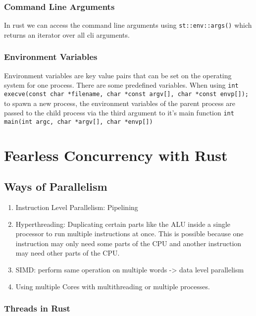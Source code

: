     \subsubsection*{Command Line Arguments}

    In rust we can access the command line arguments using \lstinline{st::env::args()} which returns an iterator over all cli arguments.

    \subsubsection*{Environment Variables}

    Environment variables are key value pairs that can be set on the operating system for one process. There are some predefined variables. When using \lstinline{int execve(const char *filename, char *const argv[], char *const envp[]);} to spawn a new process, the environment variables of the parent process are passed to the child process via the third argument to it's main function \lstinline{int main(int argc, char *argv[], char *envp[])}

    \section{Fearless Concurrency with Rust}

    \subsection{Ways of Parallelism}

    \begin{enumerate}
        \item Instruction Level Parallelism: Pipelining
        \item Hyperthreading: Duplicating certain parts like the ALU inside a single processor to run multiple instructions at once. This is possible because one instruction may only need some parts of the CPU and another instruction may need other parts of the CPU.
        \item SIMD: perform same operation on multiple words -> data level parallelism
        \item Using multiple Cores with multithreading or multiple processes.
    \end{enumerate}

    \subsubsection*{Threads in Rust}

